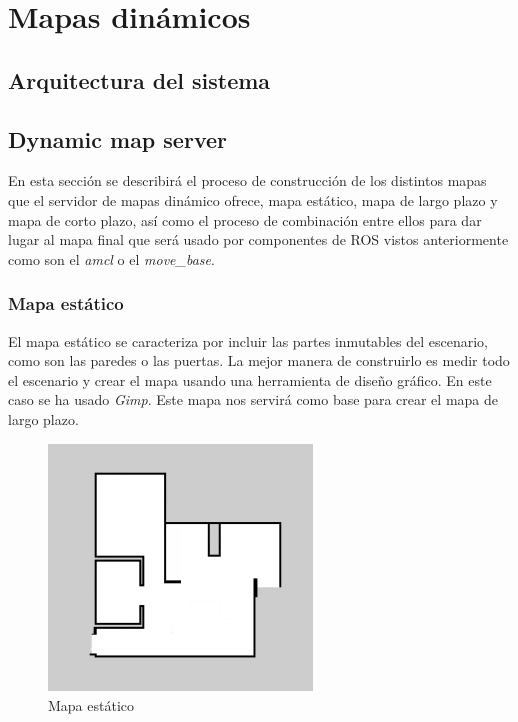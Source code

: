 \chapter{Mapas dinámicos}
\label{cap:mapasdinamicos}
\section{Arquitectura del sistema}
\label{cap:arquitecturadelsistema}



\section{Dynamic map server}
\label{cap:sevidordemapasdinamico}

En esta sección se describirá el proceso de construcción de los distintos mapas que el servidor de mapas dinámico ofrece, mapa estático, mapa de largo plazo y mapa de corto plazo, así como el proceso de combinación entre ellos para dar lugar al mapa final que será usado por componentes de ROS vistos anteriormente como son el \textit{amcl} o el \textit{move\_base}.

\subsection{Mapa estático}
El mapa estático se caracteriza por incluir las partes inmutables del escenario, como son las paredes o las puertas. La mejor manera de construirlo es medir todo el escenario y crear el mapa usando una herramienta de diseño gráfico. En este caso se ha usado \textit{Gimp}.
Este mapa nos servirá como base para crear el mapa de largo plazo.

\begin{figure} [hbtp]
  \begin{center}
    \includegraphics[width=7cm]{img/cap5/mapaestatico}
  \end{center}
  \caption{Mapa estático}
  \label{fig:mapaestatico}
\end{figure}

